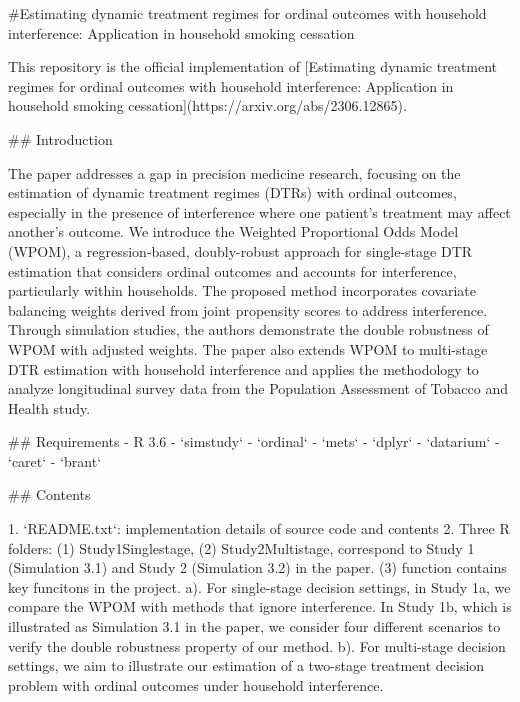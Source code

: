 #Estimating dynamic treatment regimes for ordinal outcomes with household interference: Application in household smoking cessation


This repository is the official implementation of [Estimating dynamic treatment regimes for ordinal outcomes with household interference: Application in household smoking cessation](https://arxiv.org/abs/2306.12865).

## Introduction

The paper addresses a gap in precision medicine research, focusing on the estimation of dynamic treatment regimes (DTRs) with ordinal outcomes, especially in the presence of interference where one patient's treatment may affect another's outcome. We introduce the Weighted Proportional Odds Model (WPOM), a regression-based, doubly-robust approach for single-stage DTR estimation that considers ordinal outcomes and accounts for interference, particularly within households. The proposed method incorporates covariate balancing weights derived from joint propensity scores to address interference. Through simulation studies, the authors demonstrate the double robustness of WPOM with adjusted weights. The paper also extends WPOM to multi-stage DTR estimation with household interference and applies the methodology to analyze longitudinal survey data from the Population Assessment of Tobacco and Health study.

## Requirements
 - R 3.6
 - `simstudy`
 - `ordinal`
 - `mets`
 - `dplyr`
 - `datarium`
 - `caret`
 - `brant`
 
## Contents

  1. `README.txt`: implementation details of source code and contents 
  2. Three R folders: (1) Study1Singlestage, (2) Study2Multistage, correspond to Study 1 (Simulation 3.1) and Study 2 (Simulation 3.2) in the paper. (3) function contains  key funcitons in the project. 
      a). For single-stage decision settings, in Study 1a, we compare the WPOM with methods that ignore interference. In Study 1b, which is illustrated as Simulation 3.1 in the paper, we consider four different scenarios to verify the double robustness property of our method.
      b). For multi-stage decision settings, we aim to illustrate our estimation of a two-stage treatment decision problem with ordinal outcomes under household interference.      

     
 







